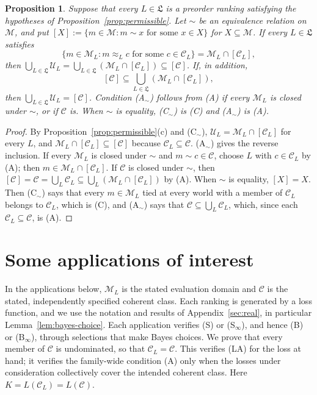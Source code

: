 \documentclass[11pt]{article}
\newtheorem{proposition}[theorem]{Proposition}
\theoremstyle{definition}
\theoremstyle{remark}
\newcommand{\M}{\mathcal M}
\newcommand{\C}{\mathcal C}
\newcommand{\U}{\mathcal U}
\begin{document}
\begin{proposition}\label{prop:permissible-equivalence}
Suppose that every $L\in\mathfrak L$ is a preorder ranking satisfying the hypotheses of Proposition~\ref{prop:permissible}. Let $\sim$ be an equivalence relation on $\M$, and put $[X]:=\{m\in\M:m\sim x\text{ for some }x\in X\}$ for $X\subseteq\M$. If every $L\in\mathfrak L$ satisfies
\begin{equation}\tag{C$_\sim$}\label{eq:identification-equivalence}
 \{m\in\M_L:m\approx_L c\text{ for some }c\in\C_L\}
 =\M_L\cap[\C_L],
\end{equation}
then $\bigcup_{L\in\mathfrak L}\U_L=\bigcup_{L\in\mathfrak L}(\M_L\cap[\C_L])\subseteq[\C]$. If, in addition,
\begin{equation}\tag{A$_\sim$}\label{eq:equivalence-coverage}
 [\C]\subseteq\bigcup_{L\in\mathfrak L}(\M_L\cap[\C_L]),
\end{equation}
then $\bigcup_{L\in\mathfrak L}\U_L=[\C]$. Condition (A$_\sim$) follows from (A) if every $\M_L$ is closed under $\sim$, or if $\C$ is. When $\sim$ is equality, (C$_\sim$) is (C) and (A$_\sim$) is (A).
\end{proposition}
\begin{proof}
By Proposition~\ref{prop:permissible}(c) and (C$_\sim$), $\U_L=\M_L\cap[\C_L]$ for every $L$, and $\M_L\cap[\C_L]\subseteq[\C]$ because $\C_L\subseteq\C$. (A$_\sim$) gives the reverse inclusion. If every $\M_L$ is closed under $\sim$ and $m\sim c\in\C$, choose $L$ with $c\in\C_L$ by (A); then $m\in\M_L\cap[\C_L]$. If $\C$ is closed under $\sim$, then $[\C]=\C=\bigcup_L\C_L\subseteq\bigcup_L(\M_L\cap[\C_L])$ by (A). When $\sim$ is equality, $[X]=X$. Then (C$_\sim$) says that every $m\in\M_L$ tied at every world with a member of $\C_L$ belongs to $\C_L$, which is (C), and (A$_\sim$) says that $\C\subseteq\bigcup_L\C_L$, which, since each $\C_L\subseteq\C$, is (A).
\end{proof}


\section{Some applications of interest}\label{sec:apps}
In the applications below, $\M_L$ is the stated evaluation domain and $\C$ is the stated, independently specified coherent class. Each ranking is generated by a loss function, and we use the notation and results of Appendix~\ref{sec:real}, in particular Lemma~\ref{lem:bayes-choice}. Each application verifies (S) or (S$_\infty$), and hence (B) or (B$_\infty$), through selections that make Bayes choices. We prove that every member of $\C$ is undominated, so that $\C_L=\C$. This verifies (LA) for the loss at hand; it verifies the family-wide condition (A) only when the losses under consideration collectively cover the intended coherent class. Here $K=L(\C_L)=L(\C)$.
\end{document}

